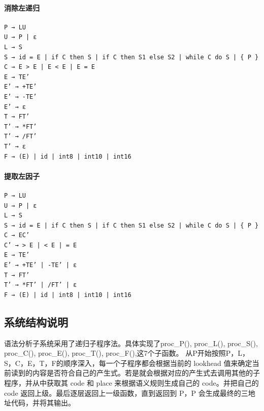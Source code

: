 \documentclass{ctexrep}
\begin{document}
\paragraph{消除左递归}
\begin{verbatim}
P → LU
U → P | ε
L → S 
S → id = E | if C then S | if C then S1 else S2 | while C do S | { P }
C → E > E | E < E | E = E
E → TE’
E’ → +TE’
E’ → -TE’
E’ → ε
T → FT’
T’ → *FT’
T’ → /FT’
T’ → ε
F → (E) | id | int8 | int10 | int16    
\end{verbatim}
\paragraph{提取左因子}
\begin{verbatim}
P → LU
U → P | ε
L → S 
S → id = E | if C then S | if C then S1 else S2 | while C do S | { P }
C → EC’
C’ → > E | < E | = E
E → TE’
E’ → +TE’ | -TE’ | ε
T → FT’
T’ → *FT’ | /FT’ | ε
F → (E) | id | int8 | int10 | int16    
\end{verbatim}
\subsection{系统结构说明}
语法分析子系统采用了递归子程序法。具体实现了proc\_P(), proc\_L(), proc\_S(), proc\_C(), proc\_E(), proc\_T(), proc\_F(),这7个子函数。
从P开始按照P，L，S，C，E，T，F的顺序深入，每一个子程序都会根据当前的 lookhead 值来确定当前读到的内容是否符合自己的产生式。若是就会根据对应的产生式去调用其他的子程序，并从中获取其 code 和 place 来根据语义规则生成自己的 code。并把自己的 code 返回上级。最后逐层返回上一级函数，直到返回到 P，P 会生成最终的三地址代码，并将其输出。
\end{document}
